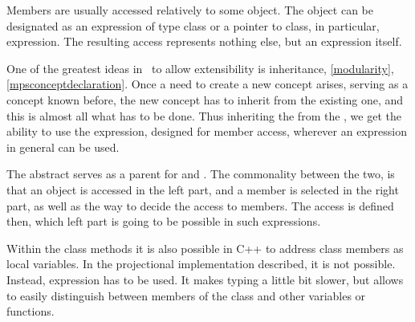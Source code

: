 
Members are usually accessed relatively to some object. The object can be designated as an expression of type class or a pointer to class,
in particular,  expression. The resulting access represents nothing else, but an expression itself.

One of the greatest ideas in \jbmps\ to allow extensibility is  inheritance, \ref{modularity}, \ref{mpsconceptdeclaration}. 
Once a need to create a new concept arises, serving as a concept known before, the new concept has to inherit from the existing one, 
and this is almost all what has to be done. Thus inheriting the   from the  
, we get the ability to use the expression, designed for member access, wherever an expression in general can be used. 

The abstract   serves as a parent for  and .
The commonality between the two, is
that an object is accessed in the left part, and a member is selected in the right part, as well as the way to decide the access to members.
The access is defined then, which left part is going to be possible in such expressions.


Within the class methods it is also possible in C++ to address class members as local variables. In the projectional implementation
described, it is not possible. Instead,  expression has to be used. It makes typing a little bit slower, but allows to
easily distinguish between members of the class and other variables or functions.
